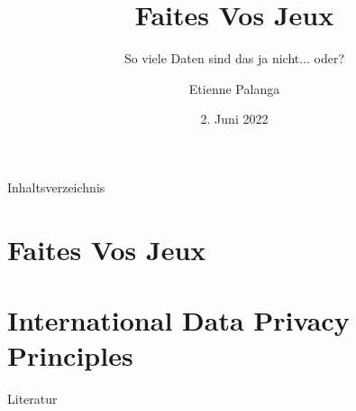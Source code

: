 \documentclass[aspectratio=169,10pt, notes]{beamer}
\title{Faites Vos Jeux}
\subtitle{So viele Daten sind das ja nicht... oder?}
\author{Etienne Palanga}
\date{2. Juni 2022}
\institute{TU Dortmund - Fakultät Informatik}
\begin{document}
\maketitle

\begin{frame}{Inhaltsverzeichnis}
    \tableofcontents
\end{frame}

\section{Faites Vos Jeux \cite{kees_faites_2017}}











\section{International Data Privacy Principles \cite{zankl_international_2014}}



\nocite{mifune}

\begin{frame}{Literatur}
\printbibliography[heading=none]
\end{frame}
\end{document}
